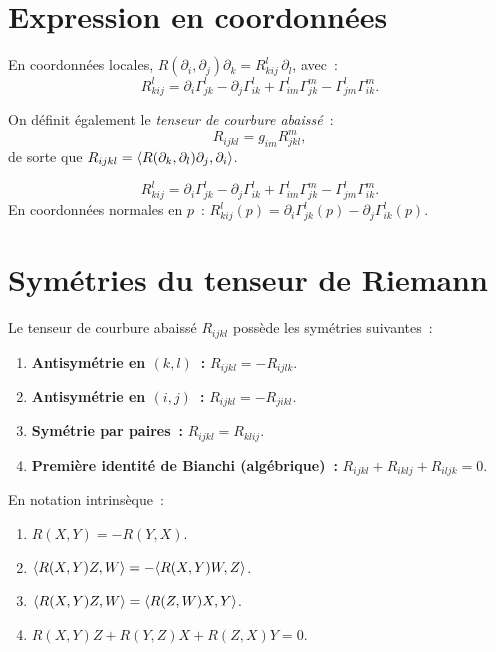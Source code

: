 \section{Expression en coordonn\'ees}

En coordonn\'ees locales, $R(\partial_i, \partial_j)\partial_k = R^l_{kij}\, \partial_l$,
avec~:
\[
    R^l_{kij} = \partial_i \Gamma^l_{jk} - \partial_j \Gamma^l_{ik}
    + \Gamma^l_{im}\Gamma^m_{jk} - \Gamma^l_{jm}\Gamma^m_{ik}.
\]

On d\'efinit \'egalement le \emph{tenseur de courbure abaiss\'e}~:
\[
    R_{ijkl} = g_{im} R^m_{jkl},
\]
de sorte que $R_{ijkl} = \langle R(\partial_k, \partial_l)\partial_j, \partial_i \rangle$.

\begin{formules}[title=\textbf{Composantes du tenseur de Riemann}]
\[
    R^l_{kij} = \partial_i \Gamma^l_{jk} - \partial_j \Gamma^l_{ik}
    + \Gamma^l_{im}\Gamma^m_{jk} - \Gamma^l_{jm}\Gamma^m_{ik}.
\]
En coordonn\'ees normales en $p$~: $R^l_{kij}(p) = \partial_i \Gamma^l_{jk}(p)
- \partial_j \Gamma^l_{ik}(p)$.
\end{formules}

\section{Sym\'etries du tenseur de Riemann}

\begin{theoreme}
\label{thm:symmetries}
Le tenseur de courbure abaiss\'e $R_{ijkl}$ poss\`ede les sym\'etries suivantes~:
\begin{enumerate}
    \item \textbf{Antisym\'etrie en $(k,l)$~:} $R_{ijkl} = -R_{ijlk}$.
    \item \textbf{Antisym\'etrie en $(i,j)$~:} $R_{ijkl} = -R_{jikl}$.
    \item \textbf{Sym\'etrie par paires~:} $R_{ijkl} = R_{klij}$.
    \item \textbf{Premi\`ere identit\'e de Bianchi (alg\'ebrique)~:}
          $R_{ijkl} + R_{iklj} + R_{iljk} = 0$.
\end{enumerate}
En notation intrins\`eque~:
\begin{enumerate}
    \item $R(X,Y) = -R(Y,X)$.
    \item $\langle R(X,Y)Z, W \rangle = -\langle R(X,Y)W, Z \rangle$.
    \item $\langle R(X,Y)Z, W \rangle = \langle R(Z,W)X, Y \rangle$.
    \item $R(X,Y)Z + R(Y,Z)X + R(Z,X)Y = 0$.
\end{enumerate}
\end{theoreme}

